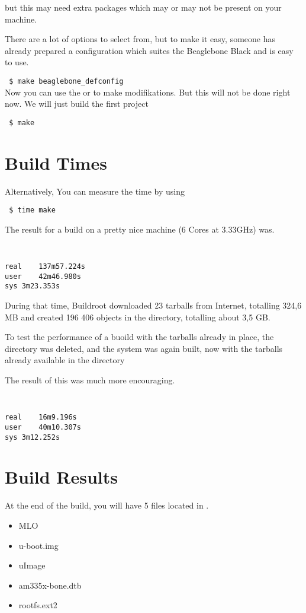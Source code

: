 but this may need extra packages which may or may not be present on your machine.

There are a lot of options to select from, but to make it easy, someone has already
prepared a configuration which suites the Beaglebone Black and is easy to use.

{\small
{\tt
\$ make beaglebone\_defconfig\\
}
}
Now you can use the  or  to
make modifikations. But this will not be done right now.
We will just build the first project

{\small
{\tt
\$ make
}
}

\section{Build Times}

Alternatively, You can measure the time by using 

{\small
{\tt
\$ time make
}
}

The result for a build on a pretty nice machine  (6 Cores at 3.33GHz) was.
{\small
{\tt
\begin{verbatim}
real	137m57.224s
user	42m46.980s
sys	3m23.353s
\end{verbatim}
}
}
During that time, Buildroot downloaded 23 tarballs from Internet, totalling 324,6 MB
and created 196 406 objects in the  directory, totalling about 3,5 GB.

To test the performance of a buoild with the tarballs already in place, the  directory was deleted,  and the system was again built, now with
the tarballs already available in the  directory

The result of this was much more encouraging.
{\small
{\tt
\begin{verbatim}
real	16m9.196s
user	40m10.307s
sys	3m12.252s
\end{verbatim}
}
}

\section{Build Results}

At the end of the build, you will have 5 files located in .

\begin{itemize}

\item MLO

\item u-boot.img

\item uImage

\item am335x-bone.dtb

\item rootfs.ext2

\end{itemize}

